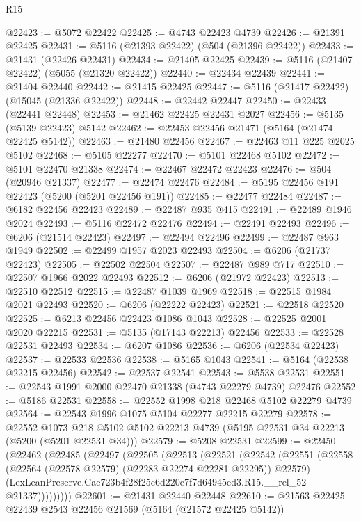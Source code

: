 \begin{lexlean}{R15}
\begin{coremodule}
{{{{{{{{{{{@22423 := @5072 @22422
@22425 := @4743 @22423 @4739
@22426 := @21391 @22425
@22431 := @5116 (@21393 @22422) (@504 (@21396 @22422))
@22433 := @21431 (@22426 @22431)
@22434 := @21405 @22425
@22439 := @5116 (@21407 @22422) (@5055 (@21320 @22422))
@22440 := @22434 @22439
@22441 := @21404 @22440
@22442 := @21415 @22425
@22447 := @5116 (@21417 @22422) (@15045 (@21336 @22422))
@22448 := @22442 @22447
@22450 := @22433 (@22441 @22448)
@22453 := @21462 @22425 @22431 @2027
@22456 := @5135 (@5139 @22423) @5142
@22462 := @22453 @22456 @21471 (@5164 (@21474 @22425 @5142))
@22463 := @21480 @22456
@22467 := @22463 @11 @225 @2025 @5102
@22468 := @5105 @22277
@22470 := @5101 @22468 @5102
@22472 := @5101 @22470 @21338
@22474 := @22467 @22472 @22423
@22476 := @504 (@20946 @21337)
@22477 := @22474 @22476
@22484 := @5195 @22456 @191 @22423 (@5200 (@5201 @22456 @191))
@22485 := @22477 @22484
@22487 := @6182 @22456 @22423
@22489 := @22487 @935 @415
@22491 := @22489 @1946 @2024
@22493 := @5116 @22472 @22476
@22494 := @22491 @22493
@22496 := @6206 (@21514 @22423)
@22497 := @22494 @22496
@22499 := @22487 @963 @1949
@22502 := @22499 @1957 @2023 @22493
@22504 := @6206 (@21737 @22423)
@22505 := @22502 @22504
@22507 := @22487 @989 @717
@22510 := @22507 @1966 @2022 @22493
@22512 := @6206 (@21972 @22423)
@22513 := @22510 @22512
@22515 := @22487 @1039 @1969
@22518 := @22515 @1984 @2021 @22493
@22520 := @6206 (@22222 @22423)
@22521 := @22518 @22520
@22525 := @6213 @22456 @22423 @1086 @1043
@22528 := @22525 @2001 @2020 @22215
@22531 := @5135 (@17143 @22213) @22456
@22533 := @22528 @22531 @22493
@22534 := @6207 @1086
@22536 := @6206 (@22534 @22423)
@22537 := @22533 @22536
@22538 := @5165 @1043
@22541 := @5164 (@22538 @22215 @22456)
@22542 := @22537 @22541
@22543 := @5538 @22531
@22551 := @22543 @1991 @2000 @22470 @21338 (@4743 @22279 @4739) @22476
@22552 := @5186 @22531
@22558 := @22552 @1998 @218 @22468 @5102 @22279 @4739
@22564 := @22543 @1996 @1075 @5104 @22277 @22215 @22279
@22578 := @22552
    @1073
    @218
    @5102
    @5102
    @22213
    @4739
    (@5195 @22531 @34 @22213 (@5200 (@5201 @22531 @34)))
@22579 := @5208 @22531
@22599 := @22450
    (@22462
      (@22485
        (@22497
          (@22505
            (@22513
              (@22521
                (@22542
                  (@22551
                    (@22558 (@22564 (@22578 @22579) (@22283 @22274 @22281 @22295)) @22579)
                    (LexLeanPreserve.Cae723b4f28f25c6d220e7f7d64945ed3.R15.__rel_52 @21337)))))))))
@22601 := @21431 @22440 @22448
@22610 := @21563 @22425 @22439 @2543 @22456 @21569 (@5164 (@21572 @22425 @5142))
}}}}}}}}}}}
\end{coremodule}
\end{lexlean}
